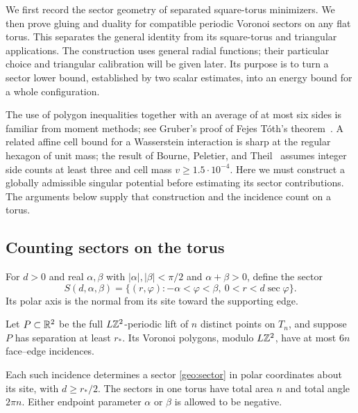 We first record the sector geometry of separated square-torus
minimizers. We then prove gluing and duality for compatible periodic
Voronoi sectors on any flat torus. This separates the general identity
from its square-torus and triangular applications. The construction
uses general radial functions; their particular choice and triangular
calibration will be given later. Its purpose is to turn a sector lower
bound, established by two scalar estimates, into an energy bound for a
whole configuration.

The use of polygon inequalities together with an average of at most
six sides is familiar from moment methods; see Gruber's proof of
Fejes T\'oth's theorem~\cite{Gruber1999}. A related affine cell bound
for a Wasserstein interaction is sharp at the regular hexagon of unit
mass; the result of Bourne, Peletier, and
Theil~\cite[arXiv v3, Lemma~12]{BournePeletierTheil2014} assumes integer
side counts at least three and cell mass \(v\geq1.5\cdot10^{-4}\).
Here we must construct a globally admissible singular potential before
estimating its sector contributions. The arguments below supply that
construction and the incidence count on a torus.

\subsection{Counting sectors on the torus}

For \(d>0\) and real \(\alpha,\beta\) with
\(|\alpha|,|\beta|<\pi/2\) and \(\alpha+\beta>0\), define the sector
\begin{equation}
 S(d,\alpha,\beta)=
 \{(r,\varphi):-\alpha<\varphi<\beta,\ 
                      0<r<d\sec\varphi\}.
 \label{geo:sector}
\end{equation}
Its polar axis is the normal from its site toward the supporting edge.

\begin{lemma}
\label{geo:voronoi}
Let \(P\subset\mathbb R^2\) be the full \(L\mathbb Z^2\)-periodic lift of \(n\)
distinct points on \(T_n\), and suppose \(P\) has separation at
least \(r_*\).  Its Voronoi polygons, modulo \(L\mathbb Z^2\), have at most
\(6n\) face--edge incidences.

Each such incidence determines a sector \eqref{geo:sector} in polar
coordinates about its site, with \(d\geq r_*/2\).
The sectors in one torus have total area \(n\) and total angle
\(2\pi n\).  Either endpoint parameter \(\alpha\) or \(\beta\) is
allowed to be negative.
\end{lemma}

